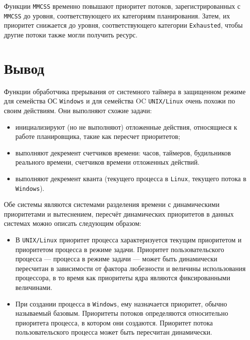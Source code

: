 Функции \texttt{MMCSS} временно повышают приоритет потоков, зарегистрированных с \texttt{MMCSS} до уровня, соответствующего их категориям планирования.  Затем, их приоритет снижается до уровня, соответствующего категории \texttt{Exhausted}, чтобы другие потоки также могли получить ресурс.

\chapter*{Вывод}

Функции обработчика прерывания от системного таймера в защищенном режиме для семейства ОС \texttt{Windows} и для семейства OC \texttt{UNIX/Linux} очень похожи по своим действиям. Они выполняют схожие задачи:

\begin{itemize}
    \item инициализируют (но не выполняют) отложенные действия, относящиеся к работе планировщика, такие как пересчет приоритетов;
    \item выполняют декремент счетчиков времени: часов, таймеров, будильников реального времени, счетчиков времени отложенных действий.
    \item выполняют декремент кванта (текущего процесса в \texttt{Linux}, текущего потока в \texttt{Windows}).
\end{itemize}

Обе системы являются системами разделения времени с динамическими приоритетами и вытеснением, пересчёт динамических приоритетов в данных системах можно описать следующим образом:
\begin{itemize}
    \item В \texttt{UNIX/Linux} приоритет процесса характеризуется текущим приоритетом и приоритетом процесса в режиме задачи. Приоритет пользовательского процесса --- процесса в режиме задачи --- может быть динамически пересчитан в зависимости от фактора любезности и величины использования процессора, в то время как приоритеты ядра являются фиксированными величинами.
    \item При создании процесса в \texttt{Windows}, ему назначается приоритет, обычно называемый базовым. Приоритеты потоков определяются относительно приоритета процесса, в котором они создаются. Приоритет потока пользовательского процесса может быть пересчитан динамически.
\end{itemize}
